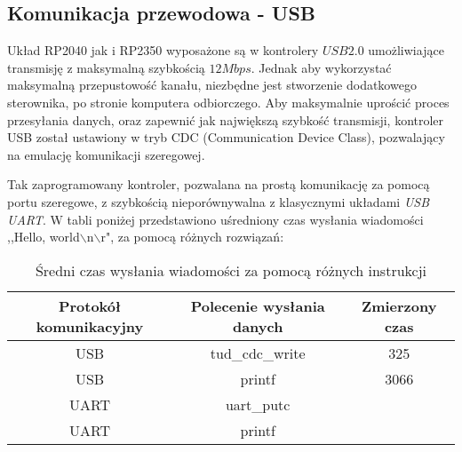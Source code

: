 \subsection{Komunikacja przewodowa - USB}
    Układ RP2040 jak i RP2350 wyposażone są w kontrolery $USB 2.0$ umożliwiające transmisję z maksymalną szybkością $12Mbps$.
    Jednak aby wykorzystać maksymalną przepustowość kanału, niezbędne jest stworzenie dodatkowego sterownika, po stronie komputera odbiorczego.
    Aby maksymalnie uprościć proces przesyłania danych, oraz zapewnić jak największą szybkość transmisji, kontroler USB został ustawiony w tryb CDC (Communication Device Class),
    pozwalający na emulację komunikacji szeregowej.

    Tak zaprogramowany kontroler, pozwalana na prostą komunikację za pomocą portu szeregowe, z szybkością nieporównywalna z klasycznymi układami \textit{USB UART}.
    W tabli poniżej przedstawiono uśredniony czas wysłania wiadomości ,,Hello, world$\backslash$n$\backslash$r", za pomocą różnych rozwiązań:
    \begin{table}[!ht]
        \centering
        \caption{Średni czas wysłania wiadomości za pomocą różnych instrukcji}
        \begin{tabular}{|c|c|c|}\hline
            Protokół komunikacyjny & Polecenie wysłania danych & Zmierzony czas\\\hline
            USB & tud\_cdc\_write &  325 \\\hline
            USB & printf          & 3066 \\\hline
            UART& uart\_putc      &  \\\hline
            UART& printf          &  \\\hline

        \end{tabular}
    \end{table}